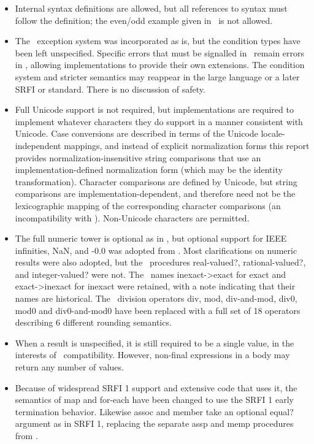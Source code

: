 \begin{itemize}
\item Internal syntax definitions are allowed, but all references to syntax
must follow the definition; the {\cf even}/{\cf odd} example given in
\rsixrs\ is not allowed.

\item The \rsixrs\ exception system was incorporated as is, but the condition
types have been left unspecified.  Specific errors that must be signalled
in \rsixrs\ remain errors in \rsevenrs, allowing implementations to provide
their own extensions.  The condition system and stricter semantics may
reappear in the large language or a later SRFI or standard. There is no
discussion of safety.

\item Full Unicode support is not required, but implementations are required to
implement whatever characters they do support in a manner
consistent with Unicode.  Case
conversions are described in terms of the Unicode locale-independent
mappings, and instead of explicit normalization forms this report provides
normalization-insensitive string comparisons that use
an implementation-defined normalization form
(which may be the identity transformation). Character comparisons are
defined by Unicode, but string comparisons are implementation-dependent,
and therefore need not be the lexicographic mapping of the corresponding
character comparisons (an incompatibility with \rfivers). Non-Unicode
characters are permitted.

\item The full numeric tower is optional as in \rfivers, but optional support for IEEE
infinities, NaN, and {\mbox -0.0} was adopted from \rsixrs. Most clarifications on
numeric results were also adopted, but the \rsixrs\ procedures {\cf real-valued?},
{\cf rational-valued?}, and {\cf integer-valued}? were not. The \rfivers\ names
{\cf inexact->exact} for {\cf exact} and {\cf exact->inexact} for {\cf inexact} were retained,
with a note indicating that their names are historical.
The \rsixrs\ division operators {\cf div}, {\cf mod}, {\cf div-and-mod}, {\cf
div0}, {\cf mod0} and {\cf div0-and-mod0} have been replaced with a full
set of 18 operators describing 6 different rounding semantics.

\item When a result is unspecified, it is still required to be a single value,
in the interests of \rfivers\ compatibility. However, non-final expressions
in a body may return any number of values.

\item Because of widespread SRFI 1 support and extensive code
that uses it, the semantics of {\cf map} and {\cf for-each} have been changed to use
the SRFI 1 early termination behavior. Likewise
{\cf assoc} and {\cf member} take an optional {\cf equal?} argument as in SRFI 1,
replacing the separate {\cf assp} and {\cf memp} procedures from \rsixrs.


\end{itemize}
